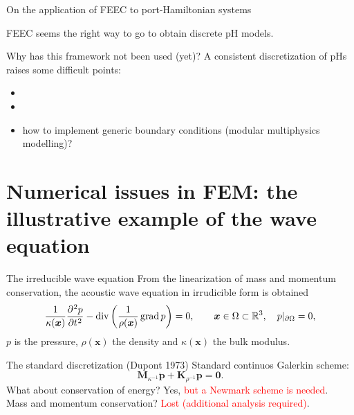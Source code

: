 \documentclass[aspectratio=169]{beamer}
\DeclareMathOperator*{\grad}{grad}
\renewcommand{\div}{\operatorname{div}}
\newcommand{\bbR}{\mathbb{R}}
\begin{document}
\begin{frame}{On the application of FEEC to port-Hamiltonian systems}

FEEC seems the right way to go to obtain discrete pH models. \\

\begin{alertblock}{Why has this framework not been used (yet)?}
A consistent discretization of pHs raises some difficult points:
\begin{itemize}
	\item {} \only<5->{\textcolor{blue}{how to exactly enforce discrete conservation laws?}}
	\item {}
	\item<4-> how to implement generic boundary conditions (modular multiphysics modelling)?
\end{itemize}
\end{alertblock}

\end{frame}

\section{Numerical issues in FEM: the illustrative example of the wave equation}


\begin{frame}{The irreducible wave equation}
From the linearization of mass and momentum conservation, the acoustic wave equation in irrudicible form is obtained
\begin{equation*}
\frac{1}{\kappa(\bm{x})} \diffp[2]{p}{t} - \div\left(\frac{1}{\rho(\bm{x})}\grad p\right) = 0,  \qquad \bm{x} \in \Omega \subset \bbR^3, \quad p|_{\partial\Omega} =0,
\end{equation*}
$p$ is the pressure, $\rho(\bm{x})$ the density and $\kappa(\bm{x})$ the bulk modulus.


\begin{block}{The standard discretization (Dupont 1973)}
	Standard continuos Galerkin scheme:
	\begin{equation*}
		\mathbf{M}_{\kappa^{-1}} \ddot{\mathbf{p}} + \mathbf{K}_{\rho^{-1}} \mathbf{p} = \mathbf{0}.
	\end{equation*}
	What about conservation of energy? Yes, \textcolor{red}{but a Newmark scheme is needed}.\\
	Mass and momentum conservation? \textcolor{red}{Lost (additional analysis required)}.
\end{block}

\end{frame}
\end{document}
